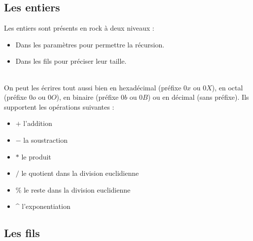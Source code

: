 \documentclass[13pt]{article}
\begin{document}
\subsection{Les entiers} 
Les entiers sont présents en rock à deux niveaux : 
\begin{itemize}
\item Dans les paramètres pour permettre la récursion.
\item Dans les fils pour préciser leur taille.
\end{itemize}
\text{}\\

On peut les écrires tout aussi bien en hexadécimal (préfixe \og $0x$\fg{} ou \og $0X$\fg{}), en
octal (préfixe \og $0o$\fg{} ou \og $0O$\fg{}), en binaire (préfixe \og $0b$ \og
ou \og $0B$\fg{}) ou en décimal (sans préfixe).
Ils supportent les opérations suivantes :
\begin{itemize}
\item $+$ l'addition
\item $-$ la soustraction
\item $*$ le produit
\item $/$ le quotient dans la division euclidienne
\item $\%$ le reste dans la division euclidienne
\item \^{} l'exponentiation
\end{itemize}


\subsection{Les fils}
\end{document}
